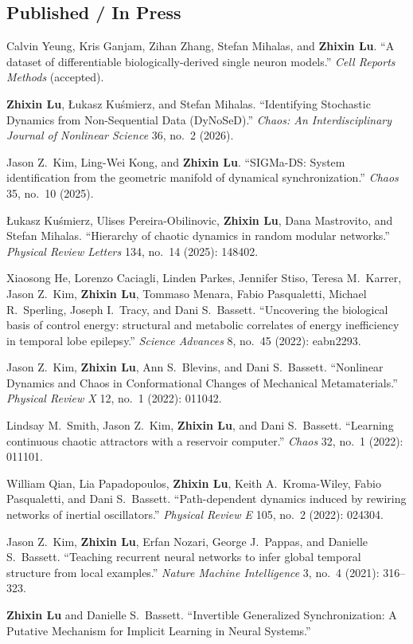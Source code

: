 \documentclass[11pt]{article}
\newenvironment{publist}{%
  \begin{list}{}{%
    \setlength{\leftmargin}{2.4em}%
    \setlength{\labelwidth}{1.9em}%
    \setlength{\labelsep}{0.5em}%
    \setlength{\itemsep}{5pt}%
    \setlength{\parsep}{0pt}%
    \setlength{\topsep}{4pt}%
    \interlinepenalty=10000}}%
  {\end{list}}
\newcommand{\pub}[1]{\item[\textbf{#1.}]}
\begin{document}
\subsection*{Published / In Press}
\begin{publist}
\pub{21} Calvin Yeung, Kris Ganjam, Zihan Zhang, Stefan Mihalas, and \textbf{Zhixin Lu}.
  ``A dataset of differentiable biologically-derived single neuron models.''
  \emph{Cell Reports Methods} (accepted).
\pub{20} \textbf{Zhixin Lu}, Łukasz Kuśmierz, and Stefan Mihalas.
  ``Identifying Stochastic Dynamics from Non-Sequential Data (DyNoSeD).''
  \emph{Chaos: An Interdisciplinary Journal of Nonlinear Science} 36, no.\ 2 (2026).
\pub{19} Jason Z.\ Kim, Ling-Wei Kong, and \textbf{Zhixin Lu}.
  ``SIGMa-DS: System identification from the geometric manifold of dynamical
  synchronization.'' \emph{Chaos} 35, no.\ 10 (2025).
\pub{18} Łukasz Kuśmierz, Ulises Pereira-Obilinovic, \textbf{Zhixin Lu}, Dana Mastrovito,
  and Stefan Mihalas. ``Hierarchy of chaotic dynamics in random modular networks.''
  \emph{Physical Review Letters} 134, no.\ 14 (2025): 148402.
\pub{17} Xiaosong He, Lorenzo Caciagli, Linden Parkes, Jennifer Stiso, Teresa M.\ Karrer,
  Jason Z.\ Kim, \textbf{Zhixin Lu}, Tommaso Menara, Fabio Pasqualetti, Michael R.\ Sperling,
  Joseph I.\ Tracy, and Dani S.\ Bassett. ``Uncovering the biological basis of control
  energy: structural and metabolic correlates of energy inefficiency in temporal lobe
  epilepsy.'' \emph{Science Advances} 8, no.\ 45 (2022): eabn2293.
\pub{16} Jason Z.\ Kim, \textbf{Zhixin Lu}, Ann S.\ Blevins, and Dani S.\ Bassett.
  ``Nonlinear Dynamics and Chaos in Conformational Changes of Mechanical Metamaterials.''
  \emph{Physical Review X} 12, no.\ 1 (2022): 011042.
\pub{15} Lindsay M.\ Smith, Jason Z.\ Kim, \textbf{Zhixin Lu}, and Dani S.\ Bassett.
  ``Learning continuous chaotic attractors with a reservoir computer.''
  \emph{Chaos} 32, no.\ 1 (2022): 011101.
\pub{14} William Qian, Lia Papadopoulos, \textbf{Zhixin Lu}, Keith A.\ Kroma-Wiley,
  Fabio Pasqualetti, and Dani S.\ Bassett. ``Path-dependent dynamics induced by
  rewiring networks of inertial oscillators.'' \emph{Physical Review E} 105, no.\ 2
  (2022): 024304.
\pub{13} Jason Z.\ Kim, \textbf{Zhixin Lu}, Erfan Nozari, George J.\ Pappas, and
  Danielle S.\ Bassett. ``Teaching recurrent neural networks to infer global temporal
  structure from local examples.'' \emph{Nature Machine Intelligence} 3, no.\ 4 (2021):
  316--323.
\pub{12} \textbf{Zhixin Lu} and Danielle S.\ Bassett. ``Invertible Generalized
  Synchronization: A Putative Mechanism for Implicit Learning in Neural Systems.''

\end{publist}
\end{document}
